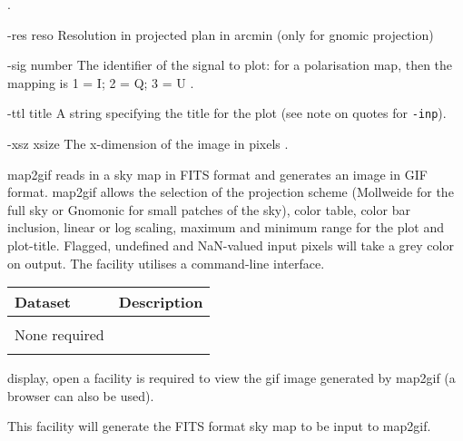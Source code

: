 \begin{qualifiers}
\begin{qulist}{}
	.
    \item[{-res reso}] Resolution in projected plan in arcmin (only for gnomic projection) 
    \item[{-sig number}] The identifier of the signal to plot: for a
      polarisation map, then the mapping is 1 = I; 2 = Q; 3 = U
      .
    \item[{-ttl title}] A string specifying the title for the plot (see note on quotes for \texttt{-inp})\nodefault.
    \item[{-xsz xsize}] The x-dimension of the image in pixels .
  \end{qulist}
\end{qualifiers}

\begin{codedescription}
{map2gif reads in a \healpix sky map in FITS format and generates an
image in GIF format. map2gif allows the selection of the projection
scheme (Mollweide for the full sky or Gnomonic for small patches of the sky), color
table, color bar inclusion, linear or log scaling, maximum and 
minimum range for the plot and plot-title. 
Flagged, undefined and NaN-valued input pixels will take a grey color on output. 
The facility utilises a command-line interface.}
\end{codedescription}

\begin{datasets}
{
\begin{tabular}{p{0.3\hsize} p{0.35\hsize}} \hline  
  \textbf{Dataset} & \textbf{Description} \\ \hline
                   &                      \\ %
  None required & \\ 
                   &                      \\ \hline %
\end{tabular}
} 
\end{datasets}

\begin{support}
  \begin{sulist}{} %
  \item[display, open] a facility is required to view the
            gif image generated by map2gif (a browser can also 
            be used).
  \item[\htmlref{synfast}{fac:synfast}] This \healpix facility will generate the FITS format 
            sky map to be input to map2gif.
  \end{sulist}
\end{support}


